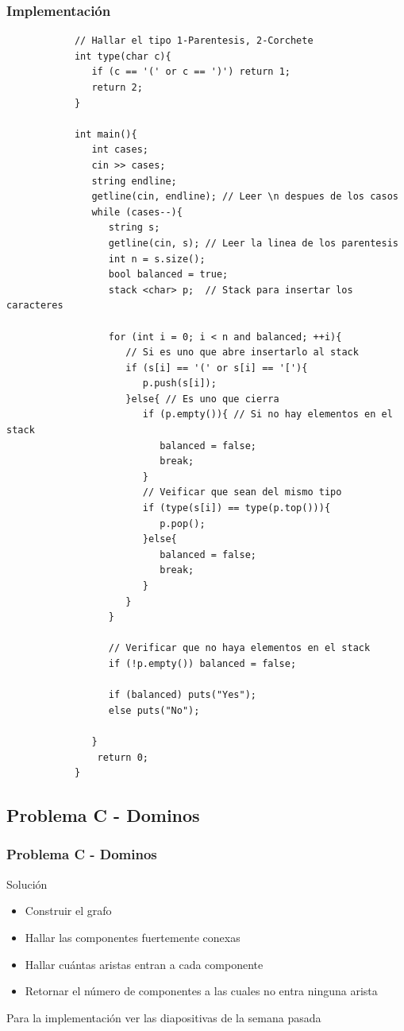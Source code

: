 \documentclass{beamer}
\begin{document}
	\begin{frame}
		\frametitle{Implementación}
		\begin{lstlisting}
			// Hallar el tipo 1-Parentesis, 2-Corchete
			int type(char c){
			   if (c == '(' or c == ')') return 1;
			   return 2;
			}

			int main(){
			   int cases;
			   cin >> cases;
			   string endline;
			   getline(cin, endline); // Leer \n despues de los casos
			   while (cases--){
			      string s;
			      getline(cin, s); // Leer la linea de los parentesis
			      int n = s.size();
			      bool balanced = true;
			      stack <char> p;  // Stack para insertar los caracteres
			
			      for (int i = 0; i < n and balanced; ++i){
			         // Si es uno que abre insertarlo al stack
			         if (s[i] == '(' or s[i] == '['){
			            p.push(s[i]);
			         }else{ // Es uno que cierra
			            if (p.empty()){ // Si no hay elementos en el stack
			               balanced = false;
			               break;
			            }
			            // Veificar que sean del mismo tipo
			            if (type(s[i]) == type(p.top())){
			               p.pop();
			            }else{
			               balanced = false;
			               break;
			            }
			         }
			      }
			
			      // Verificar que no haya elementos en el stack
			      if (!p.empty()) balanced = false;

			      if (balanced) puts("Yes");
			      else puts("No");

			   }
			    return 0;
			}
		\end{lstlisting}
	\end{frame}
	
	\subsection{Problema C - Dominos}
	\begin{frame}
		\frametitle{Problema C - Dominos}
		\begin{exampleblock}{Solución}
			\begin{itemize}
				\item Construir el grafo
				\item Hallar las componentes fuertemente conexas
				\item Hallar cuántas aristas entran a cada componente
				\item Retornar el número de componentes a las cuales no entra ninguna arista
			\end{itemize}
		\end{exampleblock}
		Para la implementación ver las diapositivas de la semana pasada
	\end{frame}
	
\end{document}
